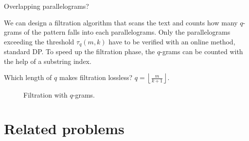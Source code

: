 Overlapping parallelograms?

We can design a filtration algorithm that scans the text and counts how many $q$-grams of the pattern falls into each parallelograms.
Only the parallelograms exceeding the threshold $\tau_q(m,k)$ have to be verified with an online method, \eg standard DP.
To speed up the filtration phase, the $q$-grams can be counted with the help of a substring index.

Which length of $q$ makes filtration lossless? $q=\left \lfloor \frac{m}{k+1} \right \rfloor$.

\begin{figure}[h]
\begin{center}
\caption{Filtration with $q$-grams.}
\label{fig:qgrams-ext}

\end{center}
\end{figure}


%


\section{Related problems}

